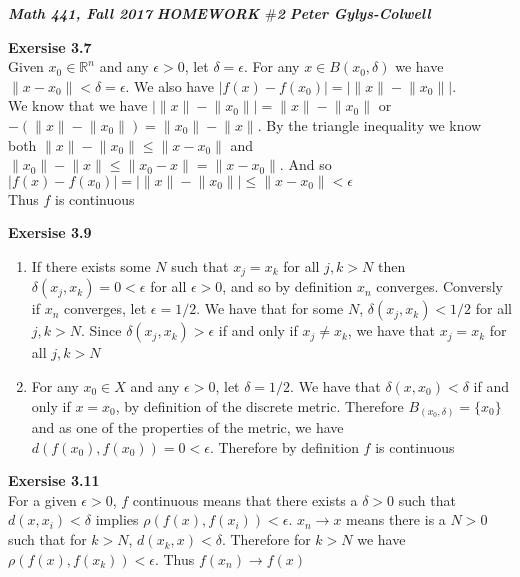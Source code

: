 \documentclass[12pt]{article}
\newenvironment{ques}[1]{\textbf{Exersise #1}\vspace{1 mm}\\ }{\bigskip}
\theoremstyle{definition}
\begin{document}
\noindent \textit{\textbf{Math 441, Fall 2017}} \hspace{1.3cm}
\textit{\textbf{HOMEWORK $\#$2}} \hspace{1.3cm} \textit{\textbf{Peter
Gylys-Colwell}} 

\vspace{1cm}

\begin{ques}{3.7}
	Given $x_0 \in \mathbb R^n$ and any $\epsilon > 0$, let $\delta =
	\epsilon$. For any $x \in B(x_0, \delta)$ we have $\lVert x
	- x_0 \rVert < \delta = \epsilon$. We also have $| f(x) - f(x_0)
	|= | \lVert x \rVert - \lVert x_0 \rVert |$. \\
	We know that we have $| \lVert x \rVert - \lVert x_0 \rVert | = \lVert
	x \rVert - \lVert x_0 \rVert$ or $-(\lVert x \rVert - \lVert x_0
	\rVert) = \lVert x_0 \rVert - \lVert x \rVert$. By the triangle
	inequality we know both $\lVert x \rVert - \lVert x_0 \rVert \leq \lVert x -
	x_0 \rVert$ and $\lVert x_0 \rVert - \lVert x \rVert \leq \lVert x_0 -
	x \rVert = \lVert x - x_0 \rVert$. And so $| f(x) - f(x_0)| = | \lVert
	x \rVert - \lVert x_0 \rVert | \leq \lVert x - x_0 \rVert < \epsilon$\\
	Thus $f$ is continuous
\end{ques}

\begin{ques}{3.9}
	\begin{enumerate}
		\item
			If there exists some $N$ such that $x_j = x_k$ for all
			$j,k > N$ then $\delta(x_j, x_k) = 0 < \epsilon$ for
			all $\epsilon > 0$, and so by definition $x_n$
			converges. Conversly if $x_n$ converges, let $\epsilon
			= 1/2$. We have that for some $N$, $\delta(x_j,x_k) <
			1/2$ for all $j,k > N$. Since $\delta(x_j,x_k) >
			\epsilon$ if and only if $x_j \neq x_k$, we have that
			$x_j = x_k$ for all $j,k > N$
		\item
			For any $x_0 \in X$ and any $\epsilon > 0$, let $\delta
			= 1/2$. We have that $\delta(x,x_0) < \delta$ if and
			only if $x = x_0$, by definition of the discrete
			metric. Therefore $B_(x_0,\delta) = \{ x_0\}$ and as
			one of the properties of the metric, we have $d(f(x_0),
			f(x_0)) = 0 < \epsilon$. Therefore by definition $f$ is continuous
	\end{enumerate}
\end{ques}

\begin{ques}{3.11}
	For a given $\epsilon > 0$, $f$ continuous means that 
	there exists a $\delta > 0 $ such that $d(x,x_i) < \delta$ implies $\rho
	(f(x) , f(x_i)) < \epsilon$. $x_n \to x$ means there is a $N > 0$ such
	that for $k > N$, $d(x_k,x) < \delta$. Therefore for $k > N$ we have $\rho
	(f(x) , f(x_k)) < \epsilon$. Thus $f(x_n) \to f(x)$
\end{ques}
\end{document}
